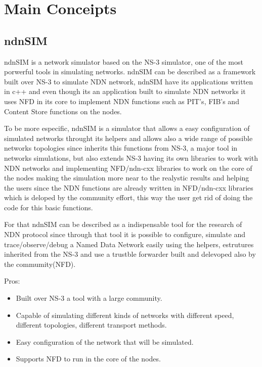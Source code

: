 \documentclass[preprint,12pt]{elsarticle}
\begin{document}
\section{Main Conceipts}
\label{S:2}
\subsection{ndnSIM}
ndnSIM is a network simulator based on the NS-3 simulator, one of the most porwerful tools in simulating networks. ndnSIM can be described as a framework built over NS-3 to simulate NDN network, ndnSIM have its applications written in c++ and even though its an application built to simulate NDN networks it uses NFD in its core to implement NDN functions such as PIT's, FIB's and Content Store functions on the nodes. \par
To be more especific, ndnSIM is a simulator that allows a easy configuration of simulated networks throught its helpers and allows also a wide range of possible networks topologies since inherits this functions from NS-3, a major tool in networks simulations, but also extends NS-3 having its own libraries to work with NDN networks and implementing NFD/ndn-cxx libraries to work on the core of the nodes making the simulation more near to the realystic results and helping the users since the NDN functions are already written in NFD/ndn-cxx libraries which is deloped by the community effort, this way the user get rid of doing the code for this basic functions.\par  
For that ndnSIM can be described as a indispensable tool for the research of NDN protocol since through that tool it is possible to configure, simulate and trace/observe/debug a Named Data Network easily using the helpers, estrutures inherited from the NS-3 and use a trustble forwarder built and delevoped also by the commumity(NFD).\par
Pros:
\begin{itemize}
		\item Built over NS-3 a tool with a large community.
		
		\item Capable of simulating different kinds of networks with different speed, different topologies, different transport methods.
		
		\item Easy configuration of the network that will be simulated.
		
		\item Supports NFD to run in the core of the nodes.
	\end{itemize}
\end{document}
